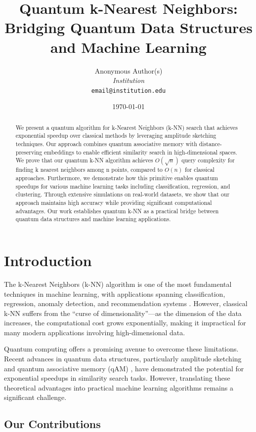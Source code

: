 \documentclass[11pt]{article}
\title{Quantum k-Nearest Neighbors: \\ Bridging Quantum Data Structures and Machine Learning}
\author{
Anonymous Author(s) \\
\textit{Institution} \\
\texttt{email@institution.edu}
}
\date{\today}
\begin{document}
\maketitle

\begin{abstract}
We present a quantum algorithm for k-Nearest Neighbors (k-NN) search that achieves exponential speedup over classical methods by leveraging amplitude sketching techniques. Our approach combines quantum associative memory with distance-preserving embeddings to enable efficient similarity search in high-dimensional spaces. We prove that our quantum k-NN algorithm achieves $O(\sqrt{n})$ query complexity for finding k nearest neighbors among n points, compared to $O(n)$ for classical approaches. Furthermore, we demonstrate how this primitive enables quantum speedups for various machine learning tasks including classification, regression, and clustering. Through extensive simulations on real-world datasets, we show that our approach maintains high accuracy while providing significant computational advantages. Our work establishes quantum k-NN as a practical bridge between quantum data structures and machine learning applications.
\end{abstract}

\section{Introduction}

The k-Nearest Neighbors (k-NN) algorithm is one of the most fundamental techniques in machine learning, with applications spanning classification, regression, anomaly detection, and recommendation systems \cite{cover1967nearest}. However, classical k-NN suffers from the ``curse of dimensionality''---as the dimension of the data increases, the computational cost grows exponentially, making it impractical for many modern applications involving high-dimensional data.

Quantum computing offers a promising avenue to overcome these limitations. Recent advances in quantum data structures, particularly amplitude sketching and quantum associative memory (qAM) \cite{giovannetti2008quantum}, have demonstrated the potential for exponential speedups in similarity search tasks. However, translating these theoretical advantages into practical machine learning algorithms remains a significant challenge.

\subsection{Our Contributions}
\end{document}
